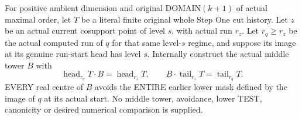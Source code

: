 \begin{theorem}
\label{hir:original-finite-stepone-cut-actual-middle-history}
\leanok
For positive ambient dimension and original DOMAIN$(k+1)$ of actual
maximal order, let $T$ be a literal finite original whole Step One cut
history. Let $z$ be an actual current cosupport point of level $s$, with
actual run $r_z$. Let $r_q\geq r_z$ be the actual computed run of $q$ for that same
level-$s$ regime, and suppose its image at its genuine run-start head has
level $s$. Internally construct the actual middle tower $B$ with
\[
 \operatorname{head}_{r_q}T\cdot B=\operatorname{head}_{r_z}T,
 \qquad B\cdot\operatorname{tail}_{r_z}T=\operatorname{tail}_{r_q}T.
\]
EVERY real centre of $B$ avoids the ENTIRE earlier lower mask defined by
the image of $q$ at its actual start. No middle tower, avoidance, lower TEST,
canonicity or desired numerical comparison is supplied.
\end{theorem}
